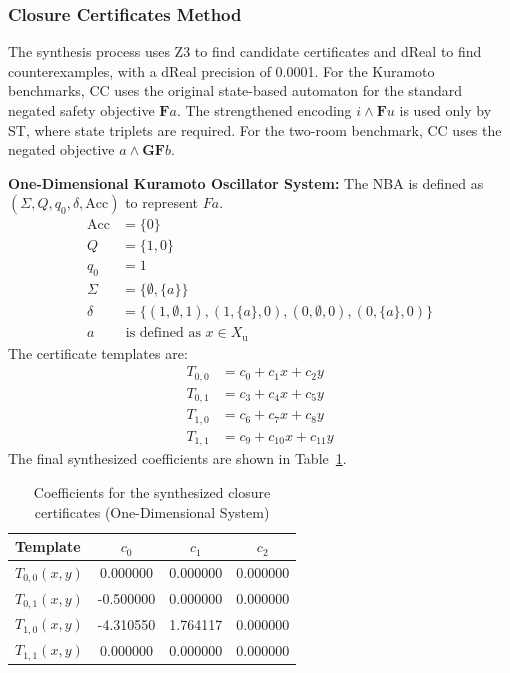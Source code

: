 \subsubsection{Closure Certificates Method}
The synthesis process uses Z3 to find candidate certificates and dReal to find counterexamples, with a dReal precision of 0.0001. For the Kuramoto benchmarks, CC uses the original state-based automaton for the standard negated safety objective $\mathbf{F}a$. The strengthened encoding $i \land \mathbf{F}u$ is used only by ST, where state triplets are required. For the two-room benchmark, CC uses the negated objective $a \land \mathbf{GF} b$.

\textbf{One-Dimensional Kuramoto Oscillator System:}
The NBA is defined as $(\Sigma, Q, q_0, \delta, \text{Acc})$ to represent $F a$.
\begin{align*}
    \text{Acc} &= \{0\} \\
    Q &= \{1, 0\} \\
    q_0 &= 1 \\
    \Sigma &= \{\emptyset, \{a\}\} \\
    \delta &= \{(1, \emptyset, 1), (1, \{a\}, 0), (0, \emptyset, 0), (0, \{a\}, 0)\} \\
	a &\text{ is defined as } x \in X_{\text{u}}
\end{align*}
The certificate templates are:
\begin{align*}
    T_{0,0} &= c_0 + c_1 x + c_2 y \\
    T_{0,1} &= c_3 + c_4 x + c_5 y \\
    T_{1,0} &= c_6 + c_7 x + c_8 y \\
    T_{1,1} &= c_9 + c_{10} x + c_{11} y
\end{align*}
The final synthesized coefficients are shown in Table~\ref{tab:coeff_1d}.

\begin{table}[h]
\centering
\caption{Coefficients for the synthesized closure certificates (One-Dimensional System)}
\label{tab:coeff_1d}
\begin{tabular}{lccc}
\hline
\textbf{Template} & $c_0$ & $c_1$ & $c_2$ \\
\hline
$T_{0,0}(x, y)$ & 0.000000 & 0.000000 & 0.000000 \\
$T_{0,1}(x, y)$ & -0.500000 & 0.000000 & 0.000000 \\
$T_{1,0}(x, y)$ & -4.310550 & 1.764117 & 0.000000 \\
$T_{1,1}(x, y)$ & 0.000000 & 0.000000 & 0.000000 \\
\hline
\end{tabular}
\end{table}

